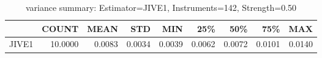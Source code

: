 \begin{table}[ht]
\centering
\caption{variance summary: Estimator=JIVE1, Instruments=142, Strength=0.50}
\begin{tabular}{lrrrrrrrr}
\toprule
 & COUNT & MEAN & STD & MIN & 25\% & 50\% & 75\% & MAX \\
\midrule
JIVE1 & 10.0000 & 0.0083 & 0.0034 & 0.0039 & 0.0062 & 0.0072 & 0.0101 & 0.0140 \\
\bottomrule
\end{tabular}
\end{table}
